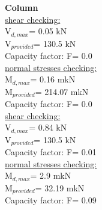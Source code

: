  \textbf{Column} \\
\underline{shear checking:} \\
V$_{d,max}$=  0.05  kN \\ V$_{provided}$=  130.5  kN \\ Capacity factor: F=  0.0  \\
\underline{normal stresses checking:} \\
M$_{d,max}$=  0.16  mkN \\ M$_{provided}$=  214.07  mkN \\ Capacity factor: F=  0.0  \\
\underline{shear checking:} \\
V$_{d,max}$=  0.84  kN \\ V$_{provided}$=  130.5  kN \\ Capacity factor: F=  0.01  \\
\underline{normal stresses checking:} \\
M$_{d,max}$=  2.9  mkN \\ M$_{provided}$=  32.19  mkN \\ Capacity factor: F=  0.09  \\
